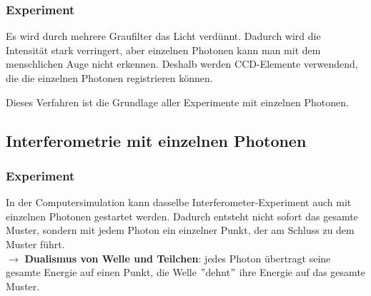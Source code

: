 \documentclass[a4paper, ngerman]{article}
\begin{document}
\subsubsection*{Experiment}
Es wird durch mehrere Graufilter das Licht verdünnt. Dadurch wird die Intensität stark verringert, aber
einzelnen Photonen kann man mit dem menschlichen Auge nicht erkennen. Deshalb werden CCD-Elemente verwendend, die
die einzelnen Photonen registrieren können.

Dieses Verfahren ist die Grundlage aller Experimente mit einzelnen Photonen.

\subsection*{Interferometrie mit einzelnen Photonen}
\subsubsection*{Experiment}
In der Computersimulation kann dasselbe Interferometer-Experiment auch mit einzelnen Photonen gestartet werden.
Dadurch entsteht nicht sofort das gesamte Muster, sondern mit jedem Photon ein einzelner Punkt, der am Schluss zu dem Muster führt. \\
$\rightarrow$ \textbf{Dualismus von Welle und Teilchen}: jedes Photon übertragt seine gesamte Energie auf einen Punkt, die Welle $"$dehnt$"$
ihre Energie auf das gesamte Muster.
\end{document}
